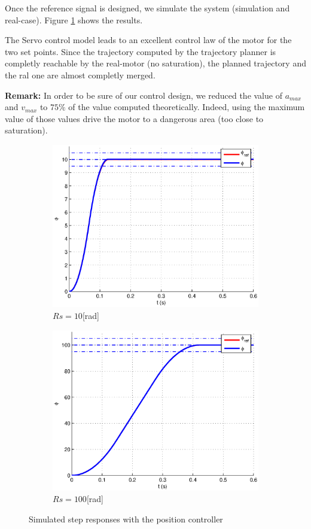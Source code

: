 Once the reference signal is designed, we simulate the system (simulation and real-case). Figure \ref{resultModelfollowing} shows the results.
 
The Servo control model leads to an excellent control law of the motor for the two set points. Since the trajectory computed by the trajectory planner is completly reachable by the real-motor (no saturation), the planned trajectory and the ral one are almost completly merged.

\textbf{Remark:} In order to be sure of our control design, we reduced the value of $a_{max}$ and $v_{max}$ to $75\%$ of the value computed theoretically. Indeed, using the maximum value of those values drive the motor to a dangerous area (too close to saturation).

\begin{figure}[ht]
  \centering
  \begin{subfigure}[b]{\linewidth}
   \includegraphics[width=\columnwidth]{fig/resultModelControl10.eps}
   \caption{$Rs = 10$[rad]}
  \end{subfigure}
  \begin{subfigure}[b]{\linewidth}
  \includegraphics[width=\columnwidth]{fig/resultModelControl100.eps}
   \caption{$Rs = 100$[rad]}
  \end{subfigure}

 \caption{Simulated step responses with the position controller}
 \label{resultModelfollowing}
\end{figure}



